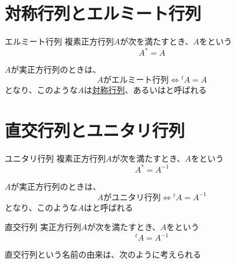 \documentclass[../../../topic_linear-algebra]{subfiles}
\begin{document}
\sectionline
\section{対称行列とエルミート行列}

\begin{definition}{エルミート行列}
  複素正方行列$A$が次を満たすとき、$A$をという
  \begin{equation*}
    A^* = A
  \end{equation*}
\end{definition}

$A$が実正方行列のときは、
\begin{equation*}
  A\text{がエルミート行列} \Longleftrightarrow {}^tA = A
\end{equation*}
となり、このような$A$は\hyperref[def:symmetric-matrix]{対称行列}、あるいはと呼ばれる

\sectionline
\section{直交行列とユニタリ行列}

\begin{definition}{ユニタリ行列}
  複素正方行列$A$が次を満たすとき、$A$をという
  \begin{equation*}
    A^* = A^{-1}
  \end{equation*}
\end{definition}

$A$が実正方行列のときは、
\begin{equation*}
  A\text{がユニタリ行列} \Longleftrightarrow {}^tA = A^{-1}
\end{equation*}
となり、このような$A$はと呼ばれる

\begin{definition}{直交行列}
  実正方行列$A$が次を満たすとき、$A$をという
  \begin{equation*}
    {}^t A = A^{-1}
  \end{equation*}
\end{definition}

直交行列という名前の由来は、次のように考えられる

\br
\end{document}
